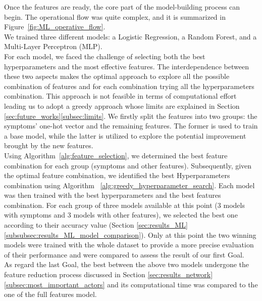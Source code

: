 \noindent
Once the features are ready, the core part of the model-building process can begin. The operational flow was quite complex,
and it is summarized in Figure~\ref{fig:ML_operative_flow}.\\
We trained three different models: a Logistic Regression, a Random Forest, and a Multi-Layer Perceptron (MLP).\\
For each model, we faced the challenge of selecting both the best hyperparameters and the most effective features.
The interdependence between these two aspects makes the optimal approach to explore all the possible combination of features
and for each combination trying all the hyperparameters combination. This approach is not feasible in terms of computational effort
leading us to adopt a greedy approach whose limits are explained in Section \ref{sec:future_works}\ref{subsec:limits}. We firstly split the features into two
groups: the symptoms' one-hot vector and the remaining features. The former is used to train a base model,
while the latter is utilized to explore the potential improvement brought by the new features.\\
Using Algorithm~\ref{alg:feature_selection}, we determined the best feature combination for each group (symptoms and other features).
Subsequently, given the optimal feature combination, we identified the best Hyperparameters combination using Algorithm
~\ref{alg:greedy_hyperparameter_search}. Each model was then trained with the best hyperparameters and the best features combination.
For each group of three models available at this point (3 models with symptoms and 3 models with other features), we selected the best one
according to their accuracy value (Section \ref{sec:results_ML}\ref{subsubsec:results_ML_model_comparison}).
Only at this point the two winning models were trained with the whole dataset to provide a more precise evaluation of their performance and
were compared to assess the result of our first Goal.\\
As regard the last Goal, the best between the above two models undergone the feature reduction process
discussed in Section \ref{sec:results_network}\ref{subsec:most_important_actors} and its computational time was compared to the one of the full features model.\\

